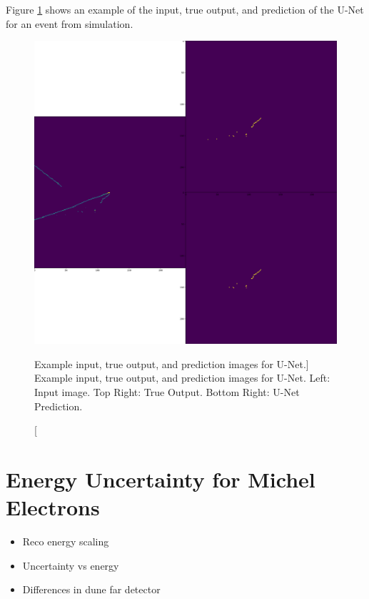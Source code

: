 Figure \ref{fig:unet_example} shows an example of the input, true output, and
prediction of the U-Net for an event from \protodune{} simulation.
\begin{figure}
	\centering
	\includegraphics[width=\textwidth]{figures/unet_example.pdf}
	\caption
	[Example input, true output, and prediction images for U-Net.]
	{Example input, true output, and prediction images for U-Net. Left: Input
	image. Top Right: True Output. Bottom Right: U-Net Prediction.}
	\label{fig:unet_example}
\end{figure}

\section{Energy Uncertainty for Michel Electrons} \label{ME_EU}
\begin{mccorrection}
	\begin{itemize}
	\item Reco energy scaling
	\item Uncertainty vs energy
	\item Differences in dune far detector
	\end{itemize}
\end{mccorrection}
